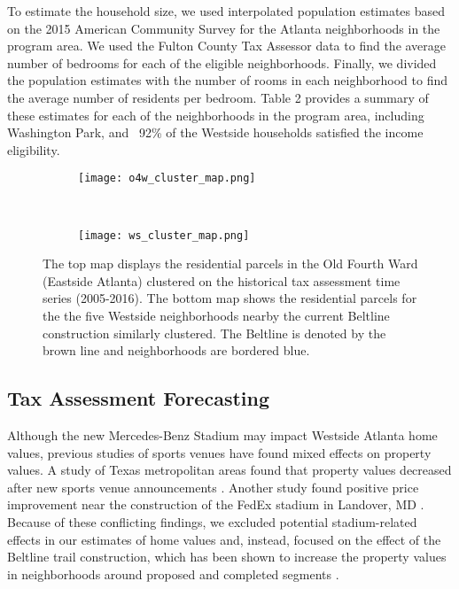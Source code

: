 \documentclass{acm_proc_article-sp}
\begin{document}
To estimate the household size, we used interpolated population estimates based on the 2015 American Community Survey for the Atlanta neighborhoods in the program area. We used the Fulton County Tax Assessor data to find the average number of bedrooms for each of the eligible neighborhoods. Finally, we divided the population estimates with the number of rooms in each neighborhood to find the average number of residents per bedroom. Table 2 provides a summary of these estimates for each of the neighborhoods in the program area, including Washington Park, and ~92\% of the Westside households satisfied the income eligibility.

\begin{figure}[b!]
\centering
\begin{subfigure}{0.475\textwidth}
  \centering
  \texttt{[image: o4w\_cluster\_map.png]}
\end{subfigure}
\\
\vspace{1mm}
\begin{subfigure}{0.475\textwidth}
  \centering
  \texttt{[image: ws\_cluster\_map.png]}
\end{subfigure}
\caption{The top map displays the residential parcels in the Old Fourth Ward (Eastside Atlanta) clustered on the historical tax assessment time series (2005-2016). The bottom map shows the residential parcels for the the five Westside neighborhoods nearby the current Beltline construction similarly clustered. The Beltline is denoted by the brown line and neighborhoods are bordered blue.}
\label{maps}
\end{figure}

\subsection{Tax Assessment Forecasting}

Although the new Mercedes-Benz Stadium may impact Westside Atlanta home values, previous studies of sports venues have found mixed effects on property values. A study of Texas metropolitan areas found that property values decreased after new sports venue announcements \cite{dehring07}. Another study found positive price improvement near the construction of the FedEx stadium in Landover, MD \cite{tu05}. Because of these conflicting findings, we excluded potential stadium-related effects in our estimates of home values and, instead, focused on the effect of the Beltline trail construction, which has been shown to increase the property values in neighborhoods around proposed and completed segments \cite{imm17}.
\end{document}

